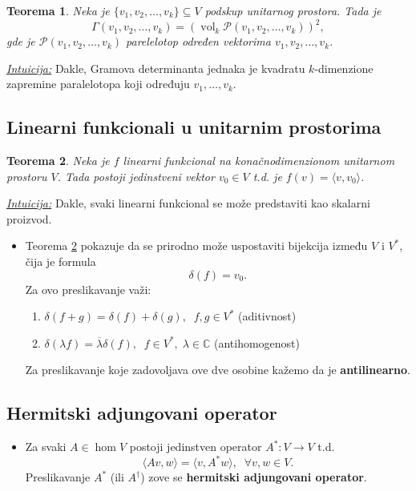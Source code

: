 \documentclass[a4paper,12pt,twoside]{report}
\newtheorem{theorem}{Teorema}[section]
\numberwithin{algorithm}{section}
\begin{document}
\begin{theorem}
    Neka je $\{ v_1, v_2, \dots, v_k \} \subseteq V$ podskup unitarnog prostora. Tada je 
    \[ \Gamma (v_1, v_2, \dots, v_k) = (\operatorname{vol}_k\mathcal{P}(v_1, v_2, \dots, v_k))^2, \]
    gde je $\mathcal{P}(v_1, v_2, \dots, v_k)$ parelelotop određen vektorima $v_1, v_2, \dots, v_k$. 
\end{theorem}
\noindent\underline{\textit{Intuicija:}} Dakle, Gramova determinanta jednaka je kvadratu $k$-dimenzione zapremine paralelotopa
koji određuju $v_1, \dots, v_k$.

\subsection{Linearni funkcionali u unitarnim prostorima}

\begin{theorem}
    \label{skalarni1}
    Neka je $f$ linearni funkcional na konačnodimenzionom unitarnom prostoru $V$. Tada postoji jedinstveni vektor $v_0 \in V$ t.d. je $f(v) = 
    \langle v, v_0 \rangle$.
\end{theorem}
\noindent\underline{\textit{Intuicija:}} Dakle, svaki linearni funkcional se može predstaviti kao skalarni proizvod.


\begin{itemize}
    \item Teorema \ref{skalarni1} pokazuje da se prirodno može uspostaviti bijekcija između $V$ i $V^*$, čija je formula
    \[ \delta(f) = v_0. \] Za ovo preslikavanje važi:
    \begin{enumerate}
        \item $\delta (f + g) = \delta(f) + \delta(g), \;\; f, g \in V^*$ (aditivnost)
        \item $\delta (\lambda f) = \overline{\lambda}\delta(f), \;\; f \in V^*, \; \lambda \in \mathbb{C}$ (antihomogenost) 
    \end{enumerate}
    Za preslikavanje koje zadovoljava ove dve osobine kažemo da je \textbf{antilinearno}.
\end{itemize}

\subsection{Hermitski adjungovani operator}

\begin{itemize}
    \item Za svaki $A \in \hom V$ postoji jedinstven operator $A^*: V \to V$ t.d.
    \[ \langle Av, w \rangle = \langle v, A^*w \rangle, \;\; \forall v, w \in V. \] Preslikavanje $A^*$ (ili $A^\dagger$) zove se \textbf{hermitski adjungovani operator}.
\end{itemize}
\end{document}
